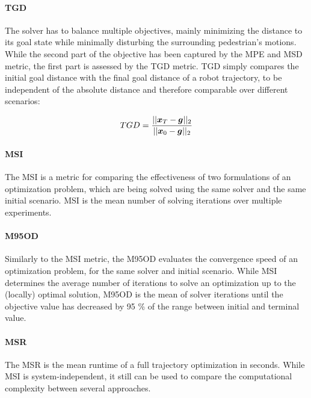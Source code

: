 \paragraph{\ac{TGD}}
The solver has to balance multiple objectives, mainly minimizing the distance to its goal state while minimally disturbing the surrounding pedestrian's motions. While the second part of the objective has been captured by the MPE and MSD metric, the first part is assessed by the \ac{TGD} metric. \ac{TGD} simply compares the initial goal distance with the final goal distance of a robot trajectory, to be independent of the absolute distance and therefore comparable over different scenarios:

\begin{equation}
TGD = \frac{||\boldsymbol{x}_T - \boldsymbol{g}||_2}{||\boldsymbol{x}_0 - \boldsymbol{g}||_2}
\end{equation}

\paragraph{\ac{MSI}}
The \ac{MSI} is a metric for comparing the effectiveness of two formulations of an optimization problem, which are being solved using the same solver and the same initial scenario. \ac{MSI} is the mean number of solving iterations over multiple experiments.

\paragraph{\ac{M95OD}}
Similarly to the \ac{MSI} metric, the \ac{M95OD} evaluates the convergence speed of an optimization problem, for the same solver and initial scenario. While \ac{MSI} determines the average number of iterations to solve an optimization up to the (locally) optimal solution, \ac{M95OD} is the mean of solver iterations until the objective value has decreased by 95 \% of the range between initial and terminal value.

\paragraph{\ac{MSR}}
The \ac{MSR} is the mean runtime of a full trajectory optimization in seconds. While \ac{MSI} is system-independent, it still can be used to compare the computational complexity between several approaches.
